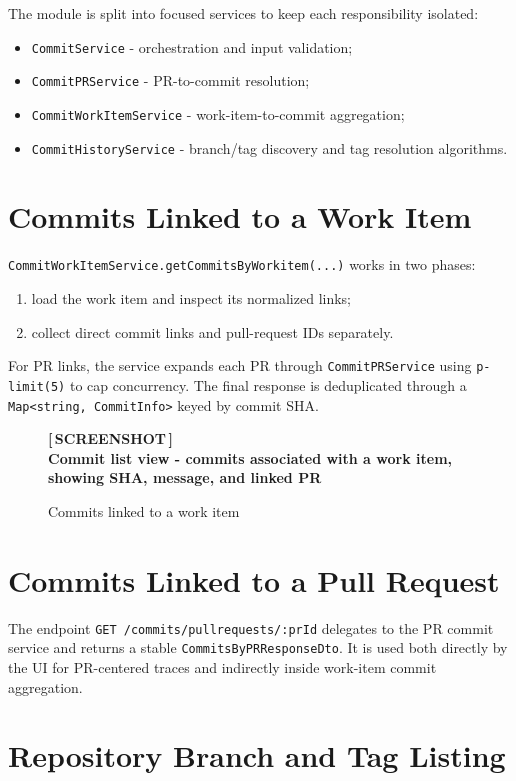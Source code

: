 \documentclass[12pt,a4paper]{report}
\newcommand{\screenshot}[2][Screenshot placeholder]{%
  \begin{figure}[H]
    \centering
    \begin{tcolorbox}[
      enhanced,
      colback=screenshotbg,
      colframe=screenshotborder,
      boxrule=1pt,
      arc=4pt,
      left=4pt, right=4pt, top=4pt, bottom=4pt,
      width=\textwidth,
      height=7cm,
      valign=center,
    ]
      \centering
      \color{primary}
      \large\bfseries [\,SCREENSHOT\,]\\[6pt]
      \normalsize\normalfont\color{darkgray}#1
    \end{tcolorbox}
    \caption{#2}
  \end{figure}%
}
\newcommand{\code}[1]{\texttt{\small\color{codered}#1}}
\begin{document}
The module is split into focused services to keep each responsibility isolated:

\begin{itemize}
  \item \code{CommitService} - orchestration and input validation;
  \item \code{CommitPRService} - PR-to-commit resolution;
  \item \code{CommitWorkItemService} - work-item-to-commit aggregation;
  \item \code{CommitHistoryService} - branch/tag discovery and tag resolution algorithms.
\end{itemize}

\section{Commits Linked to a Work Item}

\code{CommitWorkItemService.getCommitsByWorkitem(...)} works in two phases:

\begin{enumerate}
  \item load the work item and inspect its normalized links;
  \item collect direct commit links and pull-request IDs separately.
\end{enumerate}

For PR links, the service expands each PR through \code{CommitPRService} using
\code{p-limit(5)} to cap concurrency. The final response is deduplicated through
a \code{Map<string, CommitInfo>} keyed by commit SHA.

\screenshot[Commit list view - commits associated with a work item, showing SHA, message, and linked PR]{Commits linked to a work item}

\section{Commits Linked to a Pull Request}

The endpoint \code{GET /commits/pullrequests/:prId} delegates to the PR commit
service and returns a stable \code{CommitsByPRResponseDto}. It is used both
directly by the UI for PR-centered traces and indirectly inside work-item commit
aggregation.

\section{Repository Branch and Tag Listing}
\end{document}
